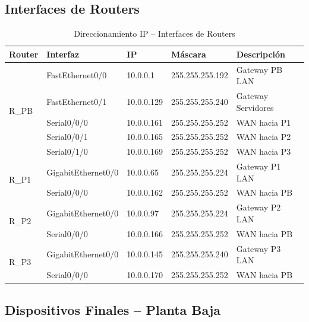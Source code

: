 \documentclass[letterpaper,11pt]{article}
\begin{document}
\subsection{Interfaces de Routers}

\begin{table}[H]
\centering
\caption{Direccionamiento IP -- Interfaces de Routers}
\label{tab:routers_ip}
\small
\renewcommand{\arraystretch}{1.2}
\begin{tabular}{|l|l|l|l|l|}
\hline
\textbf{Router} & \textbf{Interfaz} & \textbf{IP} & \textbf{Máscara} & \textbf{Descripción} \\
\hline
\multirow{5}{*}{R\_PB} & FastEthernet0/0 & 10.0.0.1 & 255.255.255.192 & Gateway PB LAN \\
\cline{2-5}
 & FastEthernet0/1 & 10.0.0.129 & 255.255.255.240 & Gateway Servidores \\
\cline{2-5}
 & Serial0/0/0 & 10.0.0.161 & 255.255.255.252 & WAN hacia P1 \\
\cline{2-5}
 & Serial0/0/1 & 10.0.0.165 & 255.255.255.252 & WAN hacia P2 \\
\cline{2-5}
 & Serial0/1/0 & 10.0.0.169 & 255.255.255.252 & WAN hacia P3 \\
\hline
\multirow{2}{*}{R\_P1} & GigabitEthernet0/0 & 10.0.0.65 & 255.255.255.224 & Gateway P1 LAN \\
\cline{2-5}
 & Serial0/0/0 & 10.0.0.162 & 255.255.255.252 & WAN hacia PB \\
\hline
\multirow{2}{*}{R\_P2} & GigabitEthernet0/0 & 10.0.0.97 & 255.255.255.224 & Gateway P2 LAN \\
\cline{2-5}
 & Serial0/0/0 & 10.0.0.166 & 255.255.255.252 & WAN hacia PB \\
\hline
\multirow{2}{*}{R\_P3} & GigabitEthernet0/0 & 10.0.0.145 & 255.255.255.240 & Gateway P3 LAN \\
\cline{2-5}
 & Serial0/0/0 & 10.0.0.170 & 255.255.255.252 & WAN hacia PB \\
\hline
\end{tabular}
\end{table}

\subsection{Dispositivos Finales -- Planta Baja}
\end{document}
